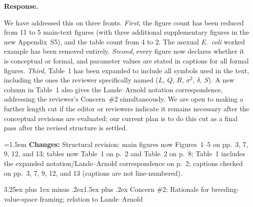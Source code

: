 \documentclass[11pt,a4paper]{article}
\makeatletter
\newcommand{\response}{%
  \par\medskip\noindent\textbf{\color{ResponseColor}Response.}\quad\ignorespaces
}
\newcommand{\changesat}[1]{%
  \par\smallskip\noindent\hangindent=1.5em\hangafter=1
  \textbf{\color{ChangeColor}Changes:} \quad #1\par\medskip
}
\renewcommand{\subsection}{\@startsection{subsection}{2}{0pt}%
  {3.25ex plus 1ex minus .2ex}{1.5ex plus .2ex}%
  {\large\bfseries}}
\makeatother
\begin{document}
\response
We have addressed this on three fronts. \textit{First}, the figure count has been reduced from 11 to 5 main-text figures (with three additional supplementary figures in the new Appendix~S5), and the table count from 4 to 2. The asexual \textit{E.~coli} worked example has been removed entirely. \textit{Second}, every figure now declares whether it is conceptual or formal, and parameter values are stated in captions for all formal figures. \textit{Third}, Table~1 has been expanded to include all symbols used in the text, including the ones the reviewer specifically named ($L$, $Q$, $R$, $\sigma^2$, $\delta$, $S$). A new column in Table~1 also gives the Lande--Arnold notation correspondence, addressing the reviewer's Concern~\#2 simultaneously. We are open to making a further length cut if the editor or reviewers indicate it remains necessary after the conceptual revisions are evaluated; our current plan is to do this cut as a final pass after the revised structure is settled.

\changesat{Structural revision: main figures now Figures~1--5 on pp.~3, 7, 9, 12, and 13; tables now Table~1 on p.~2 and Table~2 on p.~8; Table~1 includes the expanded notation/Lande--Arnold correspondence on p.~2; captions checked on pp.~3, 7, 9, 12, and 13 (captions are not line-numbered).}

\subsection{Concern \#2: Rationale for breeding-value-space framing; relation to Lande--Arnold}
\end{document}
